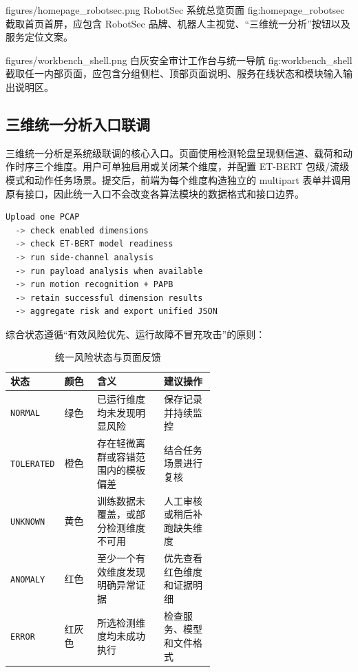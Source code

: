 \RobotSecFigure
  {figures/homepage_robotsec.png}
  {RobotSec 系统总览页面}
  {fig:homepage_robotsec}
  {截取首页首屏，应包含 RobotSec 品牌、机器人主视觉、“三维统一分析”按钮以及服务定位文案。}

\RobotSecFigure
  {figures/workbench_shell.png}
  {白灰安全审计工作台与统一导航}
  {fig:workbench_shell}
  {截取任一内部页面，应包含分组侧栏、顶部页面说明、服务在线状态和模块输入输出说明区。}

\subsection{三维统一分析入口联调}
\label{subsec:unified_analysis}

三维统一分析是系统级联调的核心入口。页面使用检测轮盘呈现侧信道、载荷和动作时序三个维度。用户可单独启用或关闭某个维度，并配置 ET-BERT 包级/流级模式和动作任务场景。提交后，前端为每个维度构造独立的 multipart 表单并调用原有接口，因此统一入口不会改变各算法模块的数据格式和接口边界。

\begin{lstlisting}[language=bash,caption={三维统一分析执行流程}]
Upload one PCAP
  -> check enabled dimensions
  -> check ET-BERT model readiness
  -> run side-channel analysis
  -> run payload analysis when available
  -> run motion recognition + PAPB
  -> retain successful dimension results
  -> aggregate risk and export unified JSON
\end{lstlisting}

综合状态遵循“有效风险优先、运行故障不冒充攻击”的原则：

\begin{table}[H]
\centering
\caption{统一风险状态与页面反馈}
\label{tab:unified_status}
\small
\begin{tabularx}{\linewidth}{p{0.18\linewidth}p{0.16\linewidth}X p{0.25\linewidth}}
\toprule
\textbf{状态} & \textbf{颜色} & \textbf{含义} & \textbf{建议操作} \\
\midrule
\texttt{NORMAL} & 绿色 & 已运行维度均未发现明显风险 & 保存记录并持续监控 \\
\texttt{TOLERATED} & 橙色 & 存在轻微离群或容错范围内的模板偏差 & 结合任务场景进行复核 \\
\texttt{UNKNOWN} & 黄色 & 训练数据未覆盖，或部分检测维度不可用 & 人工审核或稍后补跑缺失维度 \\
\texttt{ANOMALY} & 红色 & 至少一个有效维度发现明确异常证据 & 优先查看红色维度和证据明细 \\
\texttt{ERROR} & 红灰色 & 所选检测维度均未成功执行 & 检查服务、模型和文件格式 \\
\bottomrule
\end{tabularx}
\end{table}

